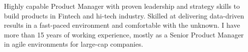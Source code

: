 

\begin{cvparagraph}


   Highly capable Product Manager with proven leadership and strategy skills to build products in Fintech and hi-tech industry. Skilled at delivering data-driven results in a fast-paced environment and comfortable with the unknown. I have more than 15 years of working experience, mostly as a Senior Product Manager in agile environments for large-cap companies.


\end{cvparagraph}
